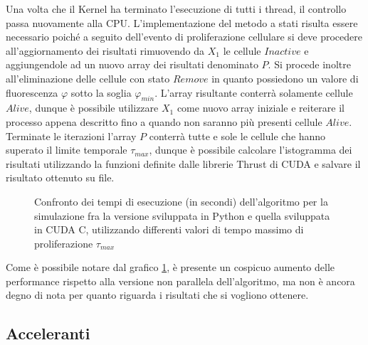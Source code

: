Una volta che il Kernel ha terminato l'esecuzione di tutti i thread, il
controllo passa nuovamente alla CPU.
L'implementazione del metodo a stati risulta essere necessario poiché a seguito
dell'evento di proliferazione cellulare
si deve procedere all'aggiornamento dei risultati rimuovendo
da $X_{1}$ le cellule $Inactive$ e aggiungendole ad un nuovo array dei
risultati denominato $P$.
Si procede inoltre all'eliminazione delle cellule con stato $Remove$ in quanto
possiedono un valore di fluorescenza $\varphi$ sotto la soglia $\varphi_{min}$.
L'array risultante conterrà solamente cellule $Alive$, dunque è possibile
utilizzare $X_{1}$ come nuovo array iniziale e reiterare
il processo appena descritto fino a quando non saranno più presenti cellule
$Alive$.
Terminate le iterazioni l'array $P$ conterrà tutte e sole le cellule che hanno
superato il limite temporale $\tau_{max}$, dunque è possibile calcolare
l'istogramma dei risultati utilizzando la funzioni definite dalle librerie
Thrust\cite{bell2011thrust} di CUDA e salvare il risultato ottenuto
su file.

\begin{figure}[t]
    \centering
    \caption{Confronto dei tempi di esecuzione (in secondi) dell'algoritmo per
        la simulazione fra la versione sviluppata in Python e quella sviluppata
        in CUDA C, utilizzando differenti valori di tempo massimo di
        proliferazione $\tau_{max}$}
    \label{chart:python-cuda}
\end{figure}

Come è possibile notare dal grafico \ref{chart:python-cuda}, è presente un
cospicuo aumento delle performance
rispetto alla versione non parallela dell'algoritmo, ma non è ancora degno
di nota per quanto riguarda i risultati che si vogliono ottenere.

\subsection{Acceleranti}

